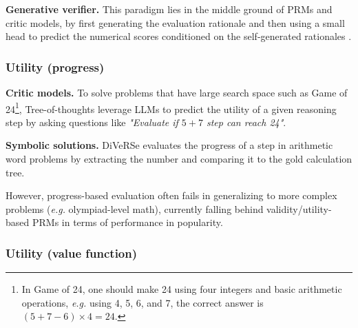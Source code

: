 
\textbf{Generative verifier.} This paradigm lies in the middle ground of PRMs and critic models, by first generating the evaluation rationale and then using a small head to predict the numerical scores conditioned on the self-generated rationales \citep{ankner2024critiqueoutloudrewardmodels, zhang2024generativeverifiersrewardmodeling}.



\subsubsection{Utility (progress)}

\textbf{Critic models.} \hspace{0.1cm} To solve problems that have large search space such as Game of 24\footnote{In Game of 24, one should make 24 using four integers and basic arithmetic operations, \textit{e.g.} using 4, 5, 6, and 7, the correct answer is $(5+7-6) \times 4 = 24$.}, Tree-of-thoughts \citep{NEURIPS2023_271db992} leverage LLMs to predict the utility of a given reasoning step by asking questions like \textit{"Evaluate if $5+7$ step can reach 24"}. 

\textbf{Symbolic solutions.} \hspace{0.1cm} DiVeRSe \citep{li-etal-2023-making} evaluates the progress of a step in arithmetic word problems by extracting the number and comparing it to the gold calculation tree.

However, progress-based evaluation often fails in generalizing to more complex problems (\textit{e.g.} olympiad-level math), currently falling behind validity/utility-based PRMs in terms of performance in popularity.

\subsubsection{Utility (value function)}

